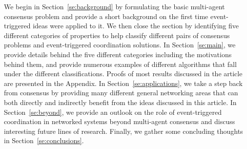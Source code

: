 \documentclass{autart}
\begin{document}
We begin in Section~\ref{se:background} by formulating the basic
multi-agent consensus problem and provide a short background on the
first time event-triggered ideas were applied to it. We then close the
section by identifying five different categories of properties to help
classify different pairs of consensus problems and event-triggered
coordination solutions. In Section~\ref{se:main}, we provide details
behind the five different categories including the motivations behind
them, and provide numerous examples of different algorithms that fall
under the different classifications. Proofs of most results discussed
in the article are presented in the Appendix.  In
Section~\ref{se:applications}, we take a step back from consensus by
providing many different general networking areas that can both
directly and indirectly benefit from the ideas discussed in this
article.  {In Section~\ref{se:beyond}, we provide an outlook
  on the role of event-triggered coordination in networked systems
  beyond multi-agent consensus and discuss interesting future lines of
  research.}  Finally, we gather some concluding thoughts in
Section~\ref{se:conclusions}.

\end{document}
